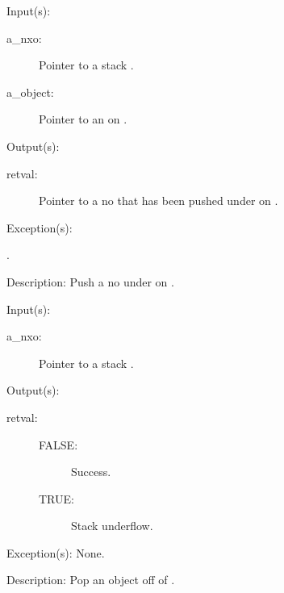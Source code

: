 \begin{capi}
\begin{capilist}
	\item[Input(s): ]
		\begin{description}\item[]
		\item[a\_nxo: ]
			Pointer to a stack .
		\item[a\_object: ]
			Pointer to an  on .
		\end{description}
	\item[Output(s): ]
		\begin{description}\item[]
		\item[retval: ]
			Pointer to a no  that has been pushed
			under  on .
		\end{description}
	\item[Exception(s): ]
		\begin{description}\item[]
		\item[.]
		\end{description}
	\item[Description: ]
		Push a no  under  on
		.
	\end{capilist}
\label{nxo_stack_pop}
	\begin{capilist}
	\item[Input(s): ]
		\begin{description}\item[]
		\item[a\_nxo: ]
			Pointer to a stack .
		\end{description}
	\item[Output(s): ]
		\begin{description}\item[]
		\item[retval: ]
			\begin{description}\item[]
			\item[FALSE: ]
				Success.
			\item[TRUE: ]
				Stack underflow.
			\end{description}
		\end{description}
	\item[Exception(s): ] None.
	\item[Description: ]
		Pop an object off of .

\end{capilist}
\end{capi}
